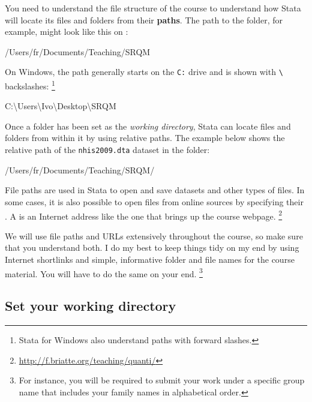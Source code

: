 	You need to understand the file structure of the course to understand how Stata will locate its files and folders from their \textbf{paths}. The path to the \SRQM folder, for example, might look like this on \OSX:\\[1em]%
	
	\begin{docspec}
		/Users/fr/Documents/Teaching/SRQM
	\end{docspec}
	
	On Windows, the path generally starts on the \texttt{C:} drive and is shown with \texttt{\textbackslash} backslashes:%
		\footnote{Stata for Windows also understand paths with forward slashes.}%
    
	\begin{docspec}
		C:\textbackslash{}Users\textbackslash{}Ivo\textbackslash{}Desktop\textbackslash{}SRQM
	\end{docspec}
	
	Once a folder has been set as the \emph{working directory}, Stata can locate files and folders from within it by using relative paths. The example below shows the relative path of the \texttt{nhis2009.dta} dataset in the \texttt{\data} folder:\\[1em]%
	
	\begin{docspec}
		/Users/fr/Documents/Teaching/SRQM/
	\end{docspec}

	File paths are used in Stata to open and save datasets and other types of files. In some cases, it is also possible to open files from online sources by specifying their \URL. A \URL is an Internet address like the one that brings up the course webpage.%
		\footnote{\url{http://f.briatte.org/teaching/quanti/}}%
	
	We will use file paths and URLs extensively throughout the course, so make sure that you understand both. I do my best to keep things tidy on my end by using Internet shortlinks and simple, informative folder and file names for the course material. You will have to do the same on your end.%
		\footnote{For instance, you will be required to submit your work under a specific group name that includes your family names in alphabetical order.}%

	\subsection{Set your working directory}%
		\label{sec:working-directory}%


